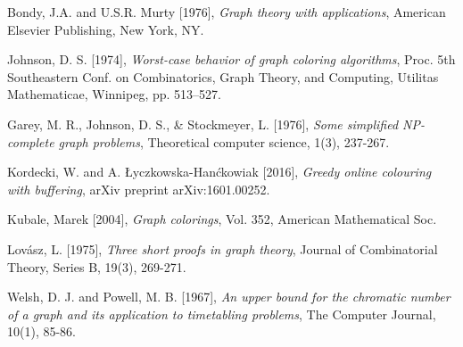 \documentclass{article}
\begin{document}
\begin{thebibliography}{9}
Bondy, J.A. and U.S.R. Murty [1976],
\emph{Graph theory with applications},
American Elsevier Publishing, New York, NY.

Johnson, D. S. [1974], \emph{Worst-case behavior of graph coloring algorithms}, Proc. 5th Southeastern Conf. on Combinatorics, Graph Theory, and Computing, Utilitas Mathematicae, Winnipeg, pp. 513–527.

Garey, M. R., Johnson, D. S., \& Stockmeyer, L. [1976], \emph{Some simplified NP-complete graph problems}, Theoretical computer science, 1(3), 237-267.

Kordecki, W. and A. Łyczkowska-Hanćkowiak [2016], \emph{Greedy online colouring with buffering}, arXiv preprint arXiv:1601.00252.

Kubale, Marek [2004], \emph{Graph colorings}, Vol. 352, American Mathematical Soc.

Lovász, L. [1975], \emph{Three short proofs in graph theory}, Journal of Combinatorial Theory, Series B, 19(3), 269-271.

Welsh, D. J. and Powell, M. B. [1967], \emph{An upper bound for the chromatic number of a graph and its application to timetabling problems}, The Computer Journal, 10(1), 85-86.

\end{thebibliography}
\end{document}

